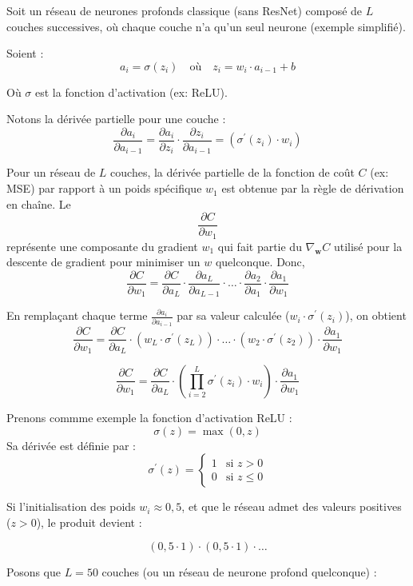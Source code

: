 \documentclass{rapportbrebeuf}
\begin{document}
Soit un réseau de neurones profonds classique (sans ResNet) composé de $L$ couches successives, où chaque couche n'a qu'un seul neurone (exemple simplifié).

Soient :
\[ a_i = \sigma(z_i) \quad \text{où} \quad z_i = w_i \cdot a_{i-1} + b \]

Où $\sigma$ est la fonction d'activation (ex: ReLU).

Notons la dérivée partielle pour une couche :
$$\frac{\partial a_i}{\partial a_{i-1}} = \frac{\partial a_i}{\partial z_{i}} \cdot \frac{\partial z_{i}}{\partial a_{i-1}} = (\sigma^\prime(z_i) \cdot w_i)$$

Pour un réseau de $L$ couches, la dérivée partielle de la fonction de coût $C$ (ex: MSE) par rapport à un poids spécifique $w_1$ est obtenue par la règle de dérivation en chaîne. Le \[ \frac{\partial C}{\partial w_1}\] représente une composante du gradient $w_1$ qui fait partie du $\nabla_{\mathbf{w}} C$ utilisé pour la descente de gradient pour minimiser un $w$ quelconque. Donc,
\[ \frac{\partial C}{\partial w_1} = \frac{\partial C}{\partial a_L} \cdot \frac{\partial a_L}{\partial a_{L-1}}  \cdot \dots \cdot  \frac{\partial a_{2}}{\partial a_1}  \cdot \frac{\partial a_1}{\partial w_1}\]

En remplaçant chaque terme $\frac{\partial a_i}{\partial a_{i-1}}$ par sa valeur calculée ($w_i \cdot \sigma^\prime(z_i)$), on obtient
$$ \frac{\partial C}{\partial w_1} = \frac{\partial C}{\partial a_L} \cdot (w_L \cdot \sigma^\prime(z_L)) \cdot \dots \cdot (w_2 \cdot \sigma^\prime(z_2)) \cdot \frac{\partial a_1}{\partial w_1} $$

$$ \frac{\partial C}{\partial w_1} = \frac{\partial C}{\partial a_L} \cdot \left( \prod_{i=2}^{L} \sigma^\prime(z_i) \cdot w_i \right) \cdot \frac{\partial a_1}{\partial w_1} $$

Prenons commme exemple la fonction d'activation ReLU :
\[ \sigma(z) = \max(0, z) \]
Sa dérivée est définie par :
\[ \sigma^\prime(z) = 
\begin{cases} 
1 & \text{si } z > 0 \\
0 & \text{si } z \leq 0
\end{cases} \]

Si l'initialisation des poids $w_i \approx 0,5$, et que le réseau admet des valeurs positives ($z > 0$), le produit devient :

\[ (0,5 \cdot 1) \cdot (0,5 \cdot 1) \cdot \dots \]

Posons que $L=50$ couches (ou un réseau de neurone profond quelconque) :
\end{document}

